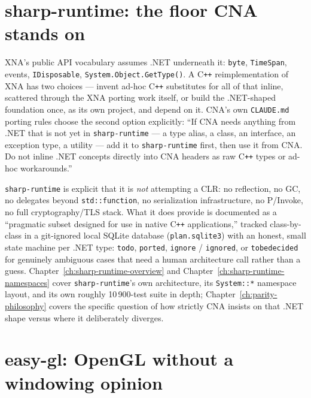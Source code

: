 \section{sharp-runtime: the floor CNA stands on}
\label{sec:sharp-runtime-intro}

XNA's public API vocabulary assumes .NET underneath it: \texttt{byte}, \texttt{TimeSpan},
events, \texttt{IDisposable}, \texttt{System.Object.GetType()}. A C\texttt{++} reimplementation
of XNA has two choices --- invent ad-hoc C\texttt{++} substitutes for all of that inline,
scattered through the XNA porting work itself, or build the .NET-shaped foundation once, as
its own project, and depend on it. CNA's own \texttt{CLAUDE.md} porting rules choose the
second option explicitly: ``If CNA needs anything from .NET that is not yet in
\texttt{sharp-runtime} --- a type alias, a class, an interface, an exception type, a utility
--- add it to \texttt{sharp-runtime} first, then use it from CNA. Do not inline .NET concepts
directly into CNA headers as raw C\texttt{++} types or ad-hoc workarounds.''

\texttt{sharp-runtime} is explicit that it is \emph{not} attempting a CLR: no reflection, no
GC, no delegates beyond \texttt{std::function}, no serialization infrastructure, no P/Invoke,
no full cryptography/TLS stack. What it does provide is documented as a ``pragmatic subset
designed for use in native C\texttt{++} applications,'' tracked class-by-class in a
git-ignored local SQLite database (\texttt{plan.sqlite3}) with an honest, small state machine
per .NET type: \texttt{todo}, \texttt{ported}, \texttt{ignore} / \texttt{ignored}, or
\texttt{tobedecided} for genuinely ambiguous cases that need a human architecture call rather
than a guess. Chapter~\ref{ch:sharp-runtime-overview} and Chapter~\ref{ch:sharp-runtime-namespaces}
cover \texttt{sharp-runtime}'s own architecture, its \texttt{System::*} namespace layout, and its
own roughly 10\,900-test suite in depth; Chapter~\ref{ch:parity-philosophy} covers the specific
question of how strictly CNA insists on that .NET shape versus where it deliberately diverges.

\section{easy-gl: OpenGL without a windowing opinion}

